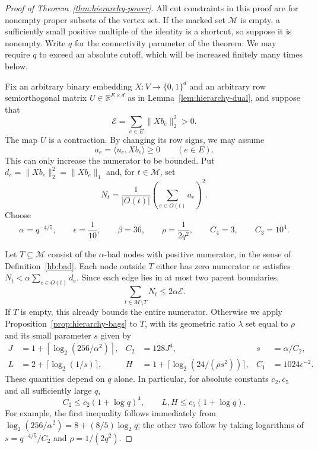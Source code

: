 \begin{proof}[Proof of Theorem~\ref{thm:hierarchy-power}]
All cut constraints in this proof are for nonempty proper subsets of
the vertex set.  If the marked set $\mathcal M$ is empty, a sufficiently
small positive multiple of the identity is a shortcut, so suppose it
is nonempty.  Write $q$ for the connectivity parameter of the
theorem.  We may require $q$ to exceed an absolute cutoff, which will
be increased finitely many times below.

Fix an arbitrary binary embedding $X:V\to\{0,1\}^d$ and an arbitrary
row semiorthogonal matrix $U\in\mathbb R^{E\times d}$ as in
Lemma~\ref{lem:hierarchy-dual}, and suppose that
\[
 \mathcal E=\sum_{e\in E}\|Xb_e\|_2^2>0.
\]
The map $U$ is a contraction.  By changing its row signs, we may
assume
\[
 a_e=\langle u_e,Xb_e\rangle\ge0
 \qquad(e\in E).
\]
This can only increase the numerator to be bounded.  Put
$d_e=\|Xb_e\|_2^2=\|Xb_e\|_1$ and, for $t\in\mathcal M$, set
\[
 N_t=\frac{1}{|O(t)|}\left(\sum_{e\in O(t)}a_e\right)^2.
\]
Choose
\begin{equation}\label{hp:parameters}
 \alpha=q^{-4/5},\qquad \epsilon=\frac1{10},\qquad
 \beta=36,\qquad \rho=\frac1{2q^2},\qquad
 C_4=3,\qquad C_3=10^4.
\end{equation}

Let $T\subseteq\mathcal M$ consist of the $\alpha$-bad nodes with
positive numerator, in the sense of Definition~\ref{hb:bad}.
Each node outside $T$ either has zero numerator or satisfies
$N_t<\alpha\sum_{e\in O(t)}d_e$.  Since each edge lies in at most
two parent boundaries,
\begin{equation}\label{hp:good}
 \sum_{t\in\mathcal M\setminus T}N_t\le2\alpha\mathcal E.
\end{equation}
If $T$ is empty, this already bounds the entire numerator.  Otherwise
we apply Proposition~\ref{prop:hierarchy-bags} to $T$, with its geometric
ratio $\lambda$ set equal to $\rho$ and its small parameter $s$ given by
\begin{equation}\label{hp:small-parameters}
 \begin{aligned}
 J&=1+\left\lceil\log_2(256/\alpha^2)\right\rceil,
 &C_2&=128J^4,
 &s&=\alpha/C_2,\\
 L&=2+\lceil\log_2(1/s)\rceil,
 &H&=1+\lceil\log_2(24/(\rho s^2))\rceil,
 &C_1&=1024\epsilon^{-2}.
 \end{aligned}
\end{equation}
These quantities depend on $q$ alone.  In particular, for absolute
constants $c_2,c_5$ and all sufficiently large $q$,
\begin{equation}\label{hp:log-growth}
 C_2\le c_2(1+\log q)^4,
 \qquad L,H\le c_5(1+\log q).
\end{equation}
For example, the first inequality follows immediately from
$\log_2(256/\alpha^2)=8+(8/5)\log_2q$; the other two follow by taking
logarithms of $s=q^{-4/5}/C_2$ and $\rho=1/(2q^2)$.


\end{proof}
